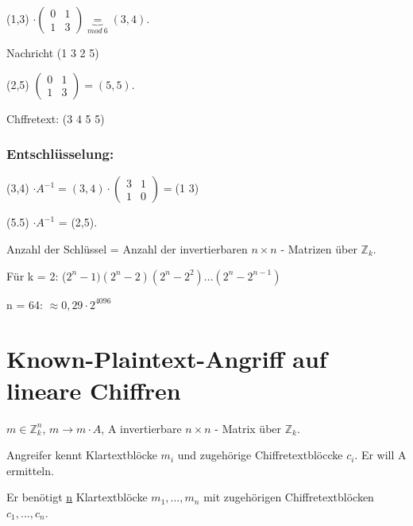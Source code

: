 (1,3) $\cdot \begin{pmatrix}0 & 1 \\ 1 & 3 \end{pmatrix} \underbrace{=}_{mod \ 6} (3,4)$.

\par \medskip

Nachricht (1 3 2 5)

\par \medskip
(2,5) $\begin{pmatrix}0 & 1 \\ 1 & 3 \end{pmatrix} = (5,5)$.

\par \medskip
Chffretext: (3 4 5 5)

\subsubsection{Entschlüsselung:}

(3,4) $\cdot A^{-1} = (3,4) \cdot \begin{pmatrix}3 & 1 \\ 1 & 0 \end{pmatrix} = $(1 3)

\par \medskip

(5.5) $\cdot A^{-1}$ = (2,5).

\par \medskip
\par \medskip
\par \medskip

Anzahl der Schlüssel = Anzahl der invertierbaren $n \times n$ - Matrizen über $\mathbb{Z}_k$.

Für k = 2: ($2^n -1) (2^n-2) (2^n - 2^2) ... (2^n - 2^{n-1})$

n = 64: $\approx 0,29 \cdot 2^{4096}$

\section{Known-Plaintext-Angriff auf lineare Chiffren}

$m \in \mathbb{Z}_{k}^n$, $m \rightarrow m \cdot A$, A invertierbare $n \times n$ - Matrix über $\mathbb{Z}_k$.

Angreifer kennt Klartextblöcke $m_i$ und zugehörige Chiffretextblöccke $c_i$. Er will A ermitteln.

Er benötigt \underline{n} Klartextblöcke $m_1, ...,m_n$  mit zugehörigen Chiffretextblöcken $c_1, ..., c_n$.

